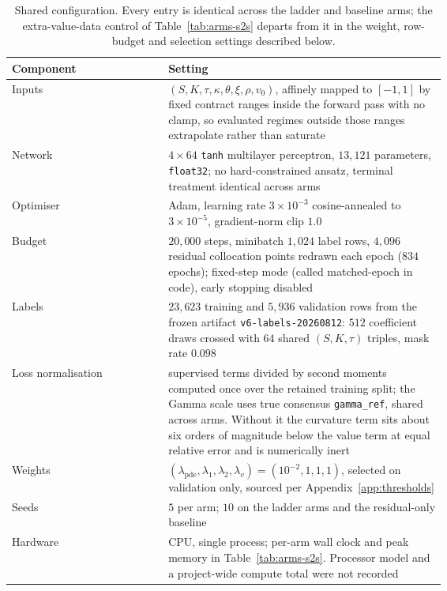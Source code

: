 \documentclass{article}
\begin{document}
\begin{table}[!htbp]
\caption{Shared configuration. Every entry is identical across the ladder and
baseline arms; the extra-value-data control of Table~\ref{tab:arms-s2s} departs from
it in the weight, row-budget and selection settings described below.}
\label{tab:trainconfig}
\centering\footnotesize\setlength{\tabcolsep}{5pt}
\begin{tabular}{@{}lp{0.64\linewidth}@{}}
\toprule
Component & Setting \\
\midrule
Inputs & $(S, K, \tau, \kappa, \theta, \xi, \rho, v_0)$, affinely mapped to $[-1,1]$ by fixed contract ranges inside the forward pass with no clamp, so evaluated regimes outside those ranges extrapolate rather than saturate \\
Network & $4 \times 64$ \texttt{tanh} multilayer perceptron, $13{,}121$ parameters, \texttt{float32}; no hard-constrained ansatz, terminal treatment identical across arms \\
Optimiser & Adam, learning rate $3\times10^{-3}$ cosine-annealed to $3\times10^{-5}$, gradient-norm clip $1.0$ \\
Budget & $20{,}000$ steps, minibatch $1{,}024$ label rows, $4{,}096$ residual collocation points redrawn each epoch ($834$ epochs); fixed-step mode (called matched-epoch in code), early stopping disabled \\
Labels & $23{,}623$ training and $5{,}936$ validation rows from the frozen artifact \texttt{v6-labels-20260812}: $512$ coefficient draws crossed with $64$ shared $(S,K,\tau)$ triples, mask rate $0.098$ \\
Loss normalisation & supervised terms divided by second moments computed once over the retained training split; the Gamma scale uses true consensus \texttt{gamma\_ref}, shared across arms. Without it the curvature term sits about six orders of magnitude below the value term at equal relative error and is numerically inert \\
Weights & $(\lambda_{\mathrm{pde}}, \lambda_1, \lambda_2, \lambda_v) = (10^{-2}, 1, 1, 1)$, selected on validation only, sourced per Appendix~\ref{app:thresholds} \\
Seeds & $5$ per arm; $10$ on the ladder arms and the residual-only baseline \\
Hardware & CPU, single process; per-arm wall clock and peak memory in Table~\ref{tab:arms-s2s}. Processor model and a project-wide compute total were not recorded \\
\bottomrule
\end{tabular}
\end{table}
\end{document}
